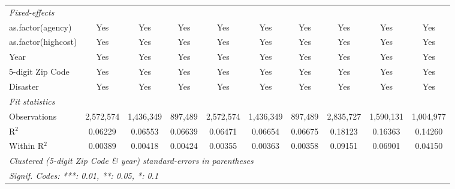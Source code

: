 \begin{tabular}{lccccccccc}
   \midrule
   \emph{Fixed-effects}\\
   as.factor(agency)                                          & Yes            & Yes            & Yes            & Yes           & Yes            & Yes           & Yes           & Yes           & Yes\\  
   as.factor(highcost)                                        & Yes            & Yes            & Yes            & Yes           & Yes            & Yes           & Yes           & Yes           & Yes\\  
   Year                                                       & Yes            & Yes            & Yes            & Yes           & Yes            & Yes           & Yes           & Yes           & Yes\\  
   5-digit Zip Code                                           & Yes            & Yes            & Yes            & Yes           & Yes            & Yes           & Yes           & Yes           & Yes\\  
   Disaster                                                   & Yes            & Yes            & Yes            & Yes           & Yes            & Yes           & Yes           & Yes           & Yes\\  
   \midrule
   \emph{Fit statistics}\\
   Observations                                               & 2,572,574      & 1,436,349      & 897,489        & 2,572,574     & 1,436,349      & 897,489       & 2,835,727     & 1,590,131     & 1,004,977\\  
   R$^2$                                                      & 0.06229        & 0.06553        & 0.06639        & 0.06471       & 0.06654        & 0.06675       & 0.18123       & 0.16363       & 0.14260\\  
   Within R$^2$                                               & 0.00389        & 0.00418        & 0.00424        & 0.00355       & 0.00363        & 0.00358       & 0.09151       & 0.06901       & 0.04150\\  
   \midrule \midrule
   \multicolumn{10}{l}{\emph{Clustered (5-digit Zip Code \& year) standard-errors in parentheses}}\\
   \multicolumn{10}{l}{\emph{Signif. Codes: ***: 0.01, **: 0.05, *: 0.1}}\\
\end{tabular}
\par\endgroup
